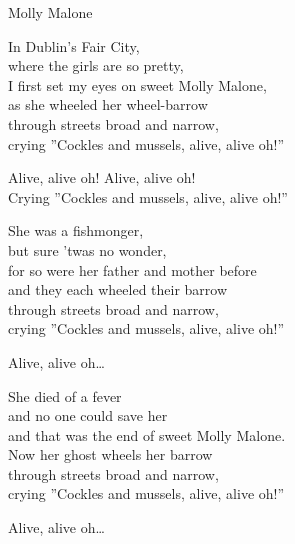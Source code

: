 \begin{song}{Molly Malone}
	
	
	

    \showversenumber	
	In Dublin's Fair City,\\
	where the girls are so pretty,\\
	I first set my eyes on sweet Molly Malone,\\
	as she wheeled her wheel-barrow\\
	through streets broad and narrow,\\
	crying ''Cockles and mussels, alive, alive oh!''
	
	Alive, alive oh! Alive, alive oh!\\
	Crying ''Cockles and mussels, alive, alive oh!''
	
    \showversenumber
	She was a fishmonger,\\
	but sure 'twas no wonder,\\
	for so were her father and mother before\\
	and they each wheeled their barrow\\
	through streets broad and narrow,\\
	crying ''Cockles and mussels, alive, alive oh!''
	
	Alive, alive oh\ldots{}
	
    \showversenumber
	She died of a fever\\
	and no one could save her\\
	and that was the end of sweet Molly Malone.\\
	Now her ghost wheels her barrow\\
	through streets broad and narrow,\\
	crying ''Cockles and mussels, alive, alive oh!''
	
	Alive, alive oh\ldots{}
	
\end{song}
